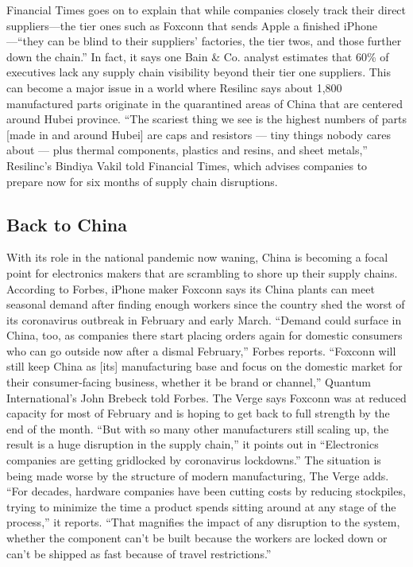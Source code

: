 \documentclass[11pt, a4paper]{article}
\begin{document}
			Financial Times goes on to explain that while companies closely track their direct suppliers—the tier ones such as Foxconn that sends Apple a finished iPhone—“they can be blind to their suppliers’ factories, the tier twos, and those further down the chain.”
			\bigbreak
			In fact, it says one Bain \& Co. analyst estimates that 60\% of executives lack any supply chain visibility beyond their tier one suppliers. This can become a major issue in a world where Resilinc says about 1,800 manufactured parts originate in the quarantined areas of China that are centered around Hubei province. 
			\bigbreak
			“The scariest thing we see is the highest numbers of parts [made in and around Hubei] are caps and resistors — tiny things nobody cares about — plus thermal components, plastics and resins, and sheet metals,” Resilinc’s Bindiya Vakil told Financial Times, which advises companies to prepare now for six months of supply chain disruptions.   

		\subsection{Back to China}

			With its role in the national pandemic now waning, China is becoming a focal point for electronics makers that are scrambling to shore up their supply chains. According to Forbes,
			\bigbreak
			iPhone maker Foxconn says its China plants can meet seasonal demand after finding enough workers since the country shed the worst of its coronavirus outbreak in February and early March.
			\bigbreak
			“Demand could surface in China, too, as companies there start placing orders again for domestic consumers who can go outside now after a dismal February,” Forbes reports. “Foxconn will still keep China as [its] manufacturing base and focus on the domestic market for their consumer-facing business, whether it be brand or channel,” Quantum International’s John Brebeck told Forbes.
			\bigbreak
			The Verge says Foxconn was at reduced capacity for most of February and is hoping to get back to full strength by the end of the month. “But with so many other manufacturers still scaling up, the result is a huge disruption in the supply chain,” it points out in “Electronics companies are getting gridlocked by coronavirus lockdowns.”
			\bigbreak
			The situation is being made worse by the structure of modern manufacturing, The Verge adds. “For decades, hardware companies have been cutting costs by reducing stockpiles, trying to minimize the time a product spends sitting around at any stage of the process,” it reports. “That magnifies the impact of any disruption to the system, whether the component can’t be built because the workers are locked down or can’t be shipped as fast because of travel restrictions.”
\end{document}
